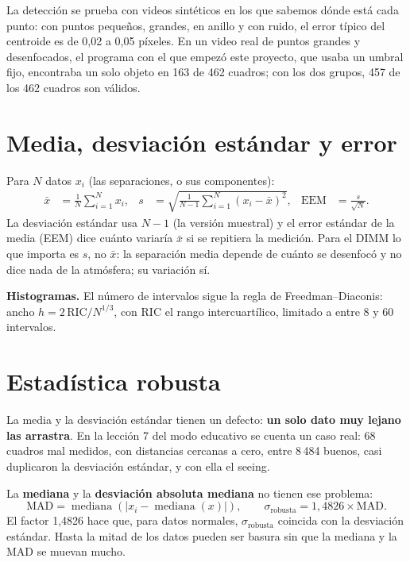 \begin{nota}
La detección se prueba con videos sintéticos en los que sabemos dónde está cada punto: con puntos pequeños, grandes, en
anillo y con ruido, el error típico del centroide es de 0,02 a 0,05 píxeles. En un video real de puntos grandes y
desenfocados, el programa con el que empezó este proyecto, que usaba un umbral fijo, encontraba un solo objeto en 163 de
462 cuadros; con los dos grupos, 457 de los 462 cuadros son válidos.
\end{nota}

\section{Media, desviación estándar y error}

Para $N$ datos $x_i$ (las separaciones, o sus componentes):
\begin{align}
\bar x &= \frac{1}{N}\sum_{i=1}^{N} x_i, &
s &= \sqrt{\frac{1}{N-1}\sum_{i=1}^{N}(x_i - \bar x)^2}, &
\text{EEM} &= \frac{s}{\sqrt N}.
\end{align}
La desviación estándar usa $N-1$ (la versión muestral) y el error estándar de la media (EEM) dice cuánto variaría
$\bar x$ si se repitiera la medición. Para el DIMM lo que importa es $s$, no $\bar x$: la separación media depende de
cuánto se desenfocó y no dice nada de la atmósfera; su variación sí.

\textbf{Histogramas.} El número de intervalos sigue la regla de Freedman–Diaconis: ancho
$h = 2\,\text{RIC}/N^{1/3}$, con RIC el rango intercuartílico, limitado a entre 8 y 60 intervalos.

\section{Estadística robusta}\label{sec:robusta}

La media y la desviación estándar tienen un defecto: \textbf{un solo dato muy lejano las arrastra}. En la lección 7 del
modo educativo se cuenta un caso real: 68 cuadros mal medidos, con distancias cercanas a cero, entre 8\,484 buenos, casi
duplicaron la desviación estándar, y con ella el seeing.

La \textbf{mediana} y la \textbf{desviación absoluta mediana} no tienen ese problema:
\begin{equation}
\text{MAD} = \operatorname{mediana}\left(|x_i - \operatorname{mediana}(x)|\right),
\qquad \sigma_\text{robusta} = 1{,}4826 \times \text{MAD}.
\end{equation}
El factor 1,4826 hace que, para datos normales, $\sigma_\text{robusta}$ coincida con la desviación estándar. Hasta la
mitad de los datos pueden ser basura sin que la mediana y la MAD se muevan mucho.


